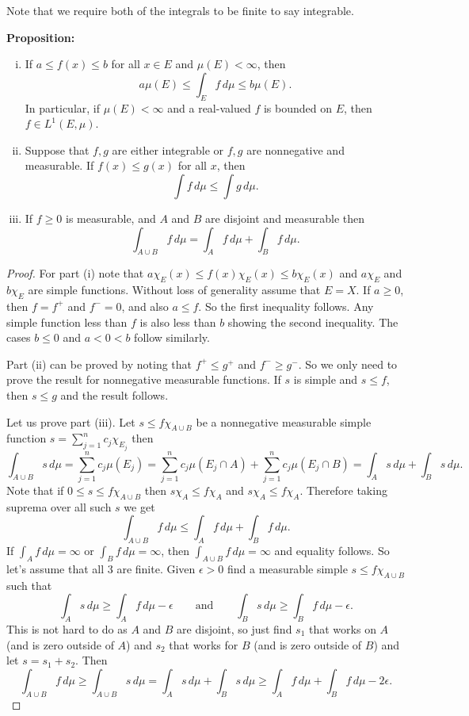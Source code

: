 \documentclass[12pt]{book}
\theoremstyle{plain}
\theoremstyle{remark}
\theoremstyle{definition}
\theoremstyle{exercise}
\theoremstyle{example}
\begin{document}
Note that we require both of the integrals to be finite to say integrable.

\medskip

\textbf{Proposition:}
\begin{enumerate}[(i)]
\item If $a \leq f(x) \leq b$ for all $x \in E$ and $\mu(E) < \infty$, then
$$
a \mu(E) \leq \int_E f\, d\mu \leq b \mu(E) .
$$
In particular, if $\mu(E) < \infty$ and a real-valued $f$ is bounded on $E$, then $f \in
L^1(E,\mu)$.
\item Suppose that $f, g$ are either integrable or $f,g$ are nonnegative and measurable.  If $f(x) \leq g(x)$ for all $x$, then
$$
\int f \, d\mu \leq \int g \, d\mu .
$$
\item If $f \geq 0$ is measurable, and $A$ and $B$ are
disjoint and measurable then
$$
\int_{A \cup B} f \, d\mu =
\int_{A} f \, d\mu +
\int_{B} f \, d\mu.
$$
\end{enumerate}

\medskip

\begin{proof}
For part (i) note that $a \chi_E(x) \leq f(x) \chi_E(x) \leq b
\chi_E(x)$ and $a \chi_E$ and $b \chi_E$ are simple functions.
Without loss of generality assume that $E = X$.
If $a \geq 0$, then $f = f^+$ and $f^- = 0$,
and also $a \leq f$.  So the first inequality follows.
Any simple function less than $f$ is also
less than $b$ showing the second inequality.  The cases $b \leq 0$
and $a < 0 < b$ follow similarly.

Part (ii) can be proved by noting that $f^+ \leq g^+$ and
$f^- \geq g^-$.  So we only need to prove the result for nonnegative
measurable functions.  If $s$ is simple and $s \leq f$, then $s \leq g$ and
the result follows.

Let us prove part (iii).
Let $s \leq f \chi_{A \cup B}$ be a nonnegative measurable simple
function $s = \sum_{j=1}^n c_j \chi_{E_j}$ then
$$
\int_{A \cup B} s \, d\mu
=
\sum_{j=1}^n c_j \mu(E_j)
=
\sum_{j=1}^n c_j \mu(E_j \cap A)
+
\sum_{j=1}^n c_j \mu(E_j \cap B)
=
\int_A s \, d\mu
+
\int_B s \, d\mu .
$$
Note that if $0 \leq s \leq f \chi_{A\cup B}$ then $s\chi_A \leq f\chi_A$
and $s\chi_A \leq f\chi_A$.  Therefore taking suprema over all such $s$
we get
$$
\int_{A \cup B} f \, d\mu
\leq
\int_A f \, d\mu
+
\int_B f \, d\mu .
$$
If $\int_A f \, d\mu = \infty$ or
$\int_B f \, d\mu = \infty$, then $\int_{A\cup B} f \, d\mu = \infty$ and
equality follows.  So let's assume that all 3 are finite.  Given $\epsilon >
0$ find a measurable simple $s\leq f \chi_{A\cup B}$ such that
$$
\int_A s \, d\mu
\geq
\int_A f \, d\mu - \epsilon
\qquad \text{and} \qquad
\int_B s \, d\mu 
\geq
\int_B f \, d\mu - \epsilon .
$$
This is not hard to do as $A$ and $B$ are disjoint, so just find $s_1$ that
works on $A$ (and is zero outside of $A$) and $s_2$ that works for $B$ (and
is zero outside of $B$) and let $s = s_1 + s_2$.
Then
$$
\int_{A \cup B} f \, d\mu
\geq
\int_{A \cup B} s \, d\mu
=
\int_A s \, d\mu
+
\int_B s \, d\mu 
\geq
\int_A f \, d\mu
+
\int_B f \, d\mu
- 2 \epsilon .
$$
\end{proof}
\end{document}
